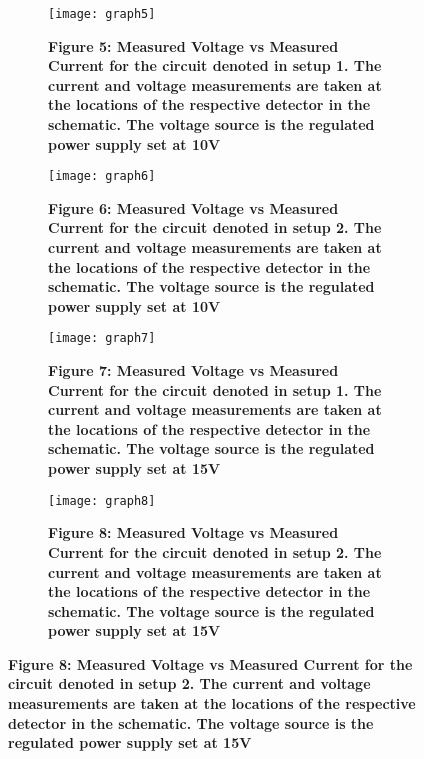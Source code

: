 \begin{figure}[H]
    \centering
    \begin{subfigure}{0.45\textwidth}
		\texttt{[image: graph5]}
		\caption{\textbf{Figure 5: Measured Voltage vs Measured Current for the circuit denoted in setup 1. The current and voltage measurements are taken at the locations of the respective detector in the schematic. The voltage source is the regulated power supply set at 10V}}
	\end{subfigure}
    \hspace{0.08\textwidth}
	\begin{subfigure}{0.45\textwidth}
		\texttt{[image: graph6]}
		\caption{\textbf{Figure 6: Measured Voltage vs Measured Current for the circuit denoted in setup 2. The current and voltage measurements are taken at the locations of the respective detector in the schematic. The voltage source is the regulated power supply set at 10V}}
	\end{subfigure}
    \begin{subfigure}{0.45\textwidth}
		\texttt{[image: graph7]}
		\caption{\textbf{Figure 7: Measured Voltage vs Measured Current for the circuit denoted in setup 1. The current and voltage measurements are taken at the locations of the respective detector in the schematic. The voltage source is the regulated power supply set at 15V}}
	\end{subfigure}
    \hspace{0.08\textwidth}
	\begin{subfigure}{0.45\textwidth}
		\texttt{[image: graph8]}
		\caption{\textbf{Figure 8: Measured Voltage vs Measured Current for the circuit denoted in setup 2. The current and voltage measurements are taken at the locations of the respective detector in the schematic. The voltage source is the regulated power supply set at 15V}}
	\end{subfigure}
\end{figure}

